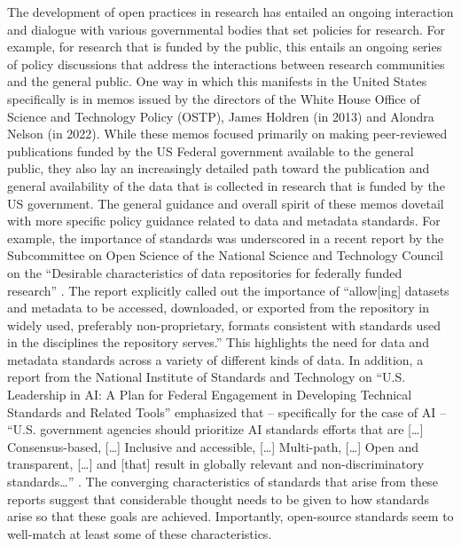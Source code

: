 \documentclass[
  number]{elsarticle}
\begin{document}
The development of open practices in research has entailed an ongoing
interaction and dialogue with various governmental bodies that set
policies for research. For example, for research that is funded by the
public, this entails an ongoing series of policy discussions that
address the interactions between research communities and the general
public. One way in which this manifests in the United States
specifically is in memos issued by the directors of the White House
Office of Science and Technology Policy (OSTP), James Holdren (in 2013)
and Alondra Nelson (in 2022). While these memos focused primarily on
making peer-reviewed publications funded by the US Federal government
available to the general public, they also lay an increasingly detailed
path toward the publication and general availability of the data that is
collected in research that is funded by the US government. The general
guidance and overall spirit of these memos dovetail with more specific
policy guidance related to data and metadata standards. For example, the
importance of standards was underscored in a recent report by the
Subcommittee on Open Science of the National Science and Technology
Council on the ``Desirable characteristics of data repositories for
federally funded research'' \citep{nstc2022desirable}. The report
explicitly called out the importance of ``allow{[}ing{]} datasets and
metadata to be accessed, downloaded, or exported from the repository in
widely used, preferably non-proprietary, formats consistent with
standards used in the disciplines the repository serves.'' This
highlights the need for data and metadata standards across a variety of
different kinds of data. In addition, a report from the National
Institute of Standards and Technology on ``U.S. Leadership in AI: A Plan
for Federal Engagement in Developing Technical Standards and Related
Tools'' emphasized that -- specifically for the case of AI -- ``U.S.
government agencies should prioritize AI standards efforts that are
{[}\ldots{]} Consensus-based, {[}\ldots{]} Inclusive and accessible,
{[}\ldots{]} Multi-path, {[}\ldots{]} Open and transparent, {[}\ldots{]}
and {[}that{]} result in globally relevant and non-discriminatory
standards\ldots{}'' \citep{NIST2019}. The converging characteristics of
standards that arise from these reports suggest that considerable
thought needs to be given to how standards arise so that these goals are
achieved. Importantly, open-source standards seem to well-match at least
some of these characteristics.
\end{document}
